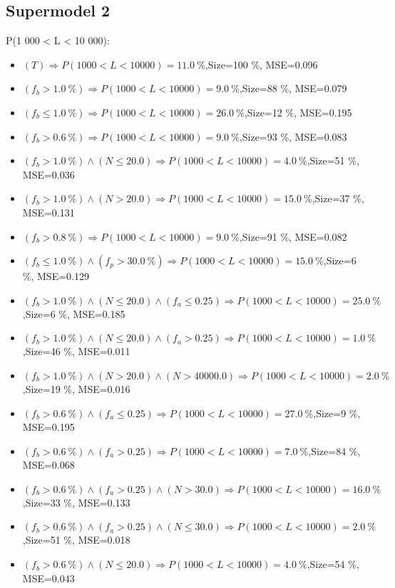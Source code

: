 \documentclass[numbered]{CSL}
\begin{document}
\subsection{Supermodel 2}
P(1 000 < L < 10 000):
\begin{itemize}
\item $(T) \Rightarrow P(1 000 < L < 10 000) = 11.0~\%$,\hfill Size=100 \%, MSE=0.096
\item $(f_b > 1.0~\%) \Rightarrow P(1 000 < L < 10 000) = 9.0~\%$,\hfill Size=88 \%, MSE=0.079
\item $(f_b \leq 1.0~\%) \Rightarrow P(1 000 < L < 10 000) = 26.0~\%$,\hfill Size=12 \%, MSE=0.195
\item $(f_b > 0.6~\%) \Rightarrow P(1 000 < L < 10 000) = 9.0~\%$,\hfill Size=93 \%, MSE=0.083
\item $(f_b > 1.0~\%) \land (N \leq 20.0) \Rightarrow P(1 000 < L < 10 000) = 4.0~\%$,\hfill Size=51 \%, MSE=0.036
\item $(f_b > 1.0~\%) \land (N > 20.0) \Rightarrow P(1 000 < L < 10 000) = 15.0~\%$,\hfill Size=37 \%, MSE=0.131
\item $(f_b > 0.8~\%) \Rightarrow P(1 000 < L < 10 000) = 9.0~\%$,\hfill Size=91 \%, MSE=0.082
\item $(f_b \leq 1.0~\%) \land (f_p > 30.0~\%) \Rightarrow P(1 000 < L < 10 000) = 15.0~\%$,\hfill Size=6 \%, MSE=0.129
\item $(f_b > 1.0~\%) \land (N \leq 20.0) \land (f_a \leq 0.25) \Rightarrow P(1 000 < L < 10 000) = 25.0~\%$,\hfill Size=6 \%, MSE=0.185
\item $(f_b > 1.0~\%) \land (N \leq 20.0) \land (f_a > 0.25) \Rightarrow P(1 000 < L < 10 000) = 1.0~\%$,\hfill Size=46 \%, MSE=0.011
\item $(f_b > 1.0~\%) \land (N > 20.0) \land (N > 40000.0) \Rightarrow P(1 000 < L < 10 000) = 2.0~\%$,\hfill Size=19 \%, MSE=0.016
\item $(f_b > 0.6~\%) \land (f_a \leq 0.25) \Rightarrow P(1 000 < L < 10 000) = 27.0~\%$,\hfill Size=9 \%, MSE=0.195
\item $(f_b > 0.6~\%) \land (f_a > 0.25) \Rightarrow P(1 000 < L < 10 000) = 7.0~\%$,\hfill Size=84 \%, MSE=0.068
\item $(f_b > 0.6~\%) \land (f_a > 0.25) \land (N > 30.0) \Rightarrow P(1 000 < L < 10 000) = 16.0~\%$,\hfill Size=33 \%, MSE=0.133
\item $(f_b > 0.6~\%) \land (f_a > 0.25) \land (N \leq 30.0) \Rightarrow P(1 000 < L < 10 000) = 2.0~\%$,\hfill Size=51 \%, MSE=0.018
\item $(f_b > 0.6~\%) \land (N \leq 20.0) \Rightarrow P(1 000 < L < 10 000) = 4.0~\%$,\hfill Size=54 \%, MSE=0.043

\end{itemize}
\end{document}
